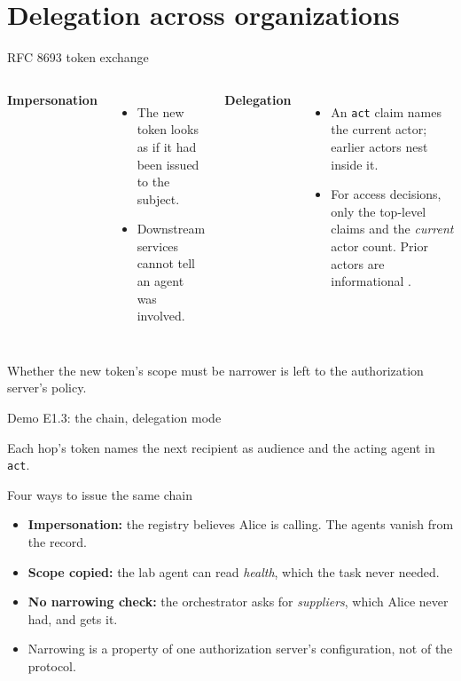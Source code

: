 \documentclass[aspectratio=169, 10pt]{beamer}
\begin{document}
\section{Delegation across organizations}

\begin{frame}{RFC 8693 token exchange}
  \begin{columns}[T]
    \textbf{Impersonation}
    \begin{itemize}\small
      \item The new token looks as if it had been issued to the subject.
      \item Downstream services cannot tell an agent was involved.
    \end{itemize}
    \textbf{Delegation}
    \begin{itemize}\small
      \item An \texttt{act} claim names the current actor; earlier actors nest inside it.
      \item For access decisions, only the top-level claims and the \emph{current} actor count. Prior actors are informational .
    \end{itemize}
  \end{columns}
  \vspace{3mm}
  {\small Whether the new token's scope must be narrower is left to the authorization server's policy.}
\end{frame}

\begin{frame}{Demo E1.3: the chain, delegation mode}
  \centering{}\par
  \vspace{2mm}
  {\small Each hop's token names the next recipient as audience and the acting agent in \texttt{act}.}
\end{frame}

\begin{frame}{Four ways to issue the same chain}
  \centering{}\par
  \vspace{2mm}
  \begin{itemize}\small
    \item \textbf{Impersonation:} the registry believes Alice is calling. The agents vanish from the record.
    \item \textbf{Scope copied:} the lab agent can read \emph{health}, which the task never needed.
    \item \textbf{No narrowing check:} the orchestrator asks for \emph{suppliers}, which Alice never had, and gets it.
    \item Narrowing is a property of one authorization server's configuration, not of the protocol.
  \end{itemize}
\end{frame}
\end{document}
